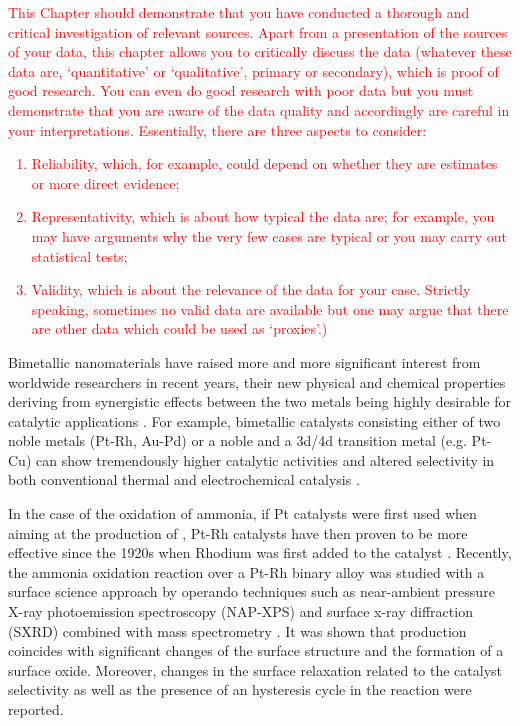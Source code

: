 \textcolor{red}{This Chapter should demonstrate that you have conducted a thorough and critical investigation of relevant sources.
Apart from a presentation of the sources of your data, this chapter allows you to critically discuss the data (whatever these data are, ‘quantitative’ or ‘qualitative’, primary or secondary), which is proof of good research. You can even do good research with poor data but you must demonstrate that you are aware of the data quality and accordingly are careful in your interpretations. Essentially, there are three aspects to consider:
\begin{enumerate}
\item	Reliability, which, for example, could depend on whether they are estimates or more direct evidence;
\item	Representativity, which is about how typical the data are; for example, you may have arguments why the very few cases are typical or you may carry out statistical tests;
\item Validity, which is about the relevance of the data for your case. Strictly speaking, sometimes no valid data are available but one may argue that there are other data which could be used as ‘proxies’.) 
\end{enumerate}
}

Bimetallic nanomaterials have raised more and more significant interest from worldwide researchers in recent years, their new physical and chemical properties deriving from synergistic effects between the two metals being highly desirable for catalytic applications \cite{}.
For example, bimetallic catalysts consisting either of two noble metals (Pt-Rh, Au-Pd) or a noble and a 3d/4d transition metal (e.g. Pt-Cu) can show tremendously higher catalytic activities and altered selectivity in both conventional thermal and electrochemical catalysis \parencite{Resta2020a, Carnis2021b}.

In the case of the oxidation of ammonia, if Pt catalysts were first used when aiming at the production of \nitricoxide, Pt-Rh catalysts have then proven to be more effective since the 1920s when Rhodium was first added to the catalyst \parencite{Handforth1934, Heck1982}.
Recently, the ammonia oxidation reaction over a Pt-Rh binary alloy was studied with a surface science approach by operando techniques such as near-ambient pressure X-ray photoemission spectroscopy (NAP-XPS) and surface x-ray diffraction (SXRD) combined with mass spectrometry \parencite{Resta2020a}.
It was shown that \nitricoxide production coincides with significant changes of the surface structure and the formation of a  surface oxide.
Moreover, changes in the surface relaxation related to the catalyst selectivity as well as the presence of an hysteresis cycle in the reaction were reported.

